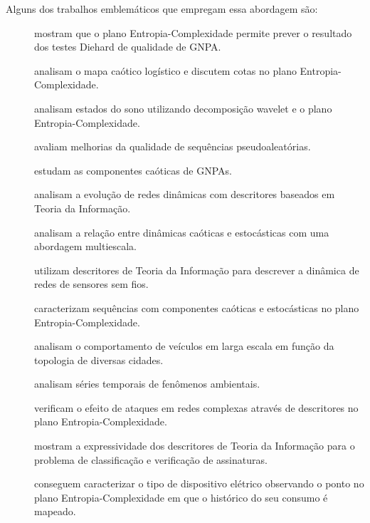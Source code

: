 Alguns dos trabalhos emblemáticos que empregam essa abordagem são:
\begin{description}
\item[\citet{RandomNumberGeneratorsCausality}] mostram que o plano Entropia-Complexidade permite prever o resultado dos testes Diehard de qualidade de GNPA.
\item[\citet{GeneralizedStatisticalComplexityMeasuresGeometricalAnalyticalProperties}] analisam o mapa caótico logístico e discutem cotas no plano Entropia-Complexidade.
\item[\citet{EEGAnalysisWaveletInformationTools}] analisam estados do sono utilizando decomposição wavelet e o plano Entropia-Complexidade.

\item[\citet{De_Micco_2008}] avaliam melhorias da qualidade de sequências pseudoaleatórias.
\item[\citet{De_Micco_2009}] estudam as componentes caóticas de GNPAs.
\item[\citet{ComplexNetworksEvolution}] analisam a evolução de redes dinâmicas com descritores baseados em Teoria da Informação.
\item[\citet{DistinguishingChaoticStochasticDynamicsTimeSeriesMultiscaleSymbolicApproach}] analisam a relação entre dinâmicas caóticas e estocásticas com uma abordagem multiescala.
\item[\citet{StructuralChangesDataCommunicationWSN}] utilizam descritores de Teoria da Informação para descrever a dinâmica de redes de sensores sem fios.
\item[\citet{DistinguishingNoiseFromChaos}] caracterizam sequências com componentes caóticas e estocásticas no plano Entropia-Complexidade.
\item[\citet{CharacterizationVehicleBehaviorInformationTheory}] analisam o comportamento de veículos em larga escala em função da topologia de diversas cidades.
\item[\citet{DiagnosingDynamicsObservedSimulatedEcosystem}] analisam séries temporais de fenômenos ambientais.
\item[\citet{InformationTheoryPerspectiveNetworkRobustness}] verificam o efeito de ataques em redes complexas através de descritores no plano Entropia-Complexidade.
\item[\citet{ClassificationVerificationOnlineHandwrittenSignatures}] mostram a expressividade dos descritores de Teoria da Informação para o problema de classificação e verificação de assinaturas.
\item[\citet{CharacterizationElectricLoadInformationTheoryQuantifiers}] conseguem caracterizar o tipo de dispositivo elétrico observando o ponto no plano Entropia-Complexidade em que o histórico do seu consumo é mapeado.
\end{description}

